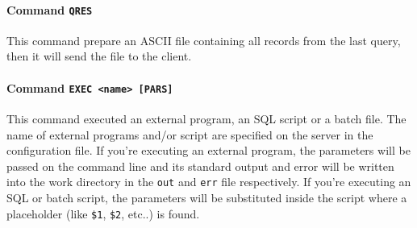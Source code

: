 \documentclass[12pt,titlepage]{article}
\newcommand{\mcs}{\textbf{MCS} }
\begin{document}
%
\paragraph{Command \texttt{QRES}}
This command prepare an ASCII file containing all records from the
last query, then it will send the file to the client.

%
\paragraph{Command \texttt{EXEC <name> [PARS]}}
This command executed an external program, an SQL script or a batch
file. The name of external programs and/or script are specified on the
server in the configuration file. If you're executing an external
program, the parameters will be passed on the command line and its
standard output and error will be written into the work directory in the
\verb|out| and \verb|err| file respectively. If you're executing an SQL
or batch script, the parameters will be substituted inside the script
where a placeholder (like \verb|$1|, \verb|$2|, etc..) is found.
%
%
%
\end{document}
